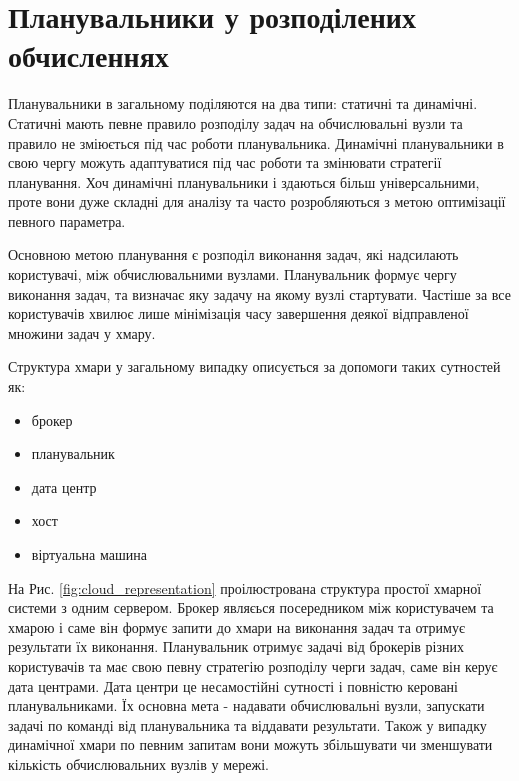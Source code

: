 
\section{Планувальники у розподілених обчисленнях}

Планувальники в загальному поділяются на два типи: статичні та динамічні. Статичні мають певне правило розподілу задач на обчислювальні вузли та правило не зміюється під час роботи планувальника. Динамічні планувальники в свою чергу можуть адаптуватися під час роботи та змінювати стратегії планування. Хоч динамічні планувальники і здаються більш універсальними, проте вони дуже складні для аналізу та часто розробляються з метою оптимізації певного параметра.

Основною метою планування є розподіл виконання задач, які надсилають користувачі, між обчислювальними вузлами. Планувальник формує чергу виконання задач, та визначає яку задачу на якому вузлі стартувати. Частіше за все користувачів хвилює лише мінімізація часу завершення деякої відправленої множини задач у хмару.

Структура хмари у загальному випадку описується за допомоги таких сутностей як:
\begin{itemize}
	\item брокер
	\item планувальник
	\item дата центр
	\item хост
	\item віртуальна машина
\end{itemize}

На Рис. \ref{fig:cloud_representation} проілюстрована структура простої хмарної системи з одним сервером. Брокер являєься посередником між користувачем та хмарою і саме він формує запити до хмари на виконання задач та отримує результати їх виконання. Планувальник отримує задачі від брокерів різних користувачів та має свою певну стратегію розподілу черги задач, саме він керує дата центрами. Дата центри це несамостійні сутності і повністю керовані планувальниками. Їх основна мета - надавати обчислювальні вузли, запускати задачі по команді від планувальника та віддавати результати. Також у випадку динамічної хмари по певним запитам вони можуть збільшувати чи зменшувати кількість обчислювальних вузлів у мережі.

